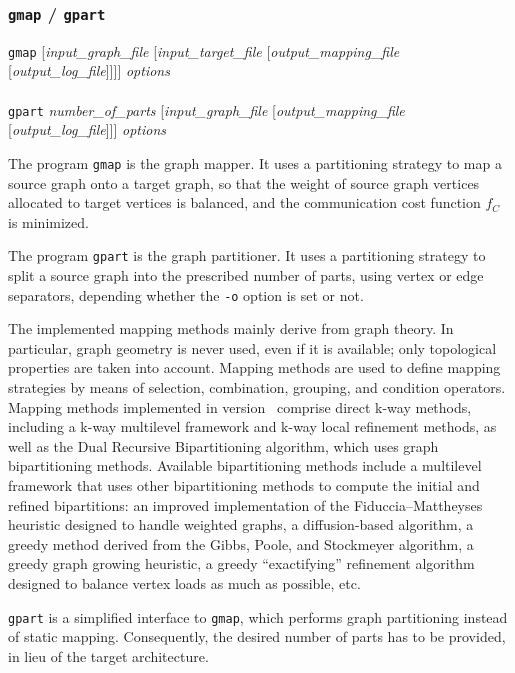 \subsubsection{\texttt{gmap} / \texttt{gpart}}
\label{sec-prog-gmap}

\begin{itemize}
\progsyn
\texttt{gmap} [{\it input\_graph\_file} [{\it input\_target\_file} [{\it output\_mapping\_file} [{\it output\_log\_file}]]]] {\it options}\\
~\\
\texttt{gpart} {\it number\_\lbt of\_\lbt parts} [{\it input\_graph\_file} [{\it output\_mapping\_file} [{\it output\_log\_file}]]] {\it options}

\progdes
The program \texttt{gmap} is the graph mapper. It uses a partitioning
strategy to map a source graph onto a target graph, so that the weight of
source graph vertices allocated to target vertices is balanced, and the
communication cost function $f_C$ is minimized.

The program \texttt{gpart} is the graph partitioner. It uses a
partitioning strategy to split a source graph into the prescribed
number of parts, using vertex or edge separators, depending whether
the \texttt{-o} option is set or not.

The implemented mapping methods mainly derive from graph theory.  In
particular, graph geometry is never used, even if it is available;
only topological properties are taken into account. Mapping methods
are used to define mapping strategies by means of selection,
combination, grouping, and condition operators.
\\

Mapping methods implemented in version~{} comprise direct k-way
methods, including a k-way multilevel framework and k-way local
refinement methods, as well as the Dual
Recursive Bipartitioning algorithm, which uses graph bipartitioning
methods. Available bipartitioning methods include a multilevel
framework that uses other bipartitioning methods to compute the
initial and refined bipartitions: an improved implementation of the
Fiduccia--Mattheyses heuristic designed to handle weighted graphs,
a diffusion-based algorithm, a greedy method derived from the Gibbs,
Poole, and Stockmeyer algorithm, a greedy graph growing heuristic, a
greedy ``exactifying'' refinement algorithm designed to balance vertex
loads as much as possible, etc.

\texttt{gpart} is a simplified interface to \texttt{gmap}, which performs
graph partitioning instead of static mapping. Consequently, the
desired number of parts has to be provided, in lieu of the target
architecture.


\end{itemize}
